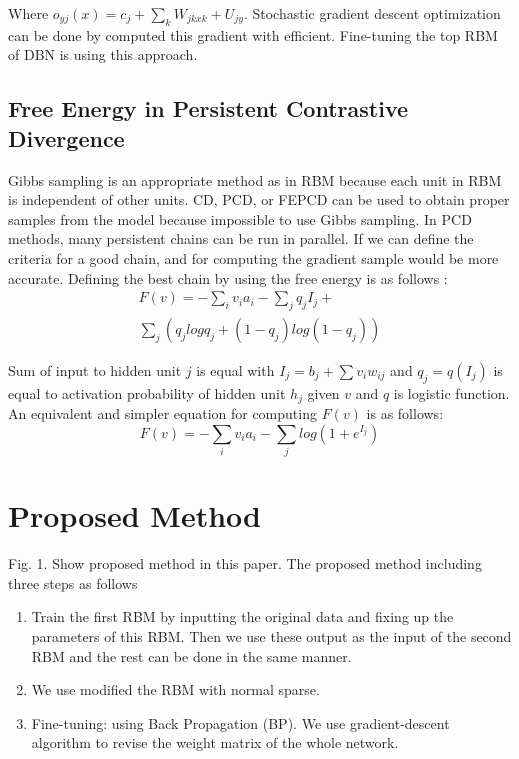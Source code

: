 \documentclass[conference]{IEEEtran}
\begin{document}
Where $o_{yj}\left ( x \right )=c_{j}+\sum_{k}W_{jkxk} + U_{jy}$. Stochastic gradient descent
optimization can be done by computed this gradient with
efficient. Fine-tuning the top RBM of DBN is using this
approach\cite{hinton1}.
\subsection{Free Energy in Persistent Contrastive Divergence}
Gibbs sampling is an appropriate method as in RBM
because each unit in RBM is independent of other units.
CD, PCD, or FEPCD\cite{keyvanrad2} can be used to obtain proper
samples from the model because impossible to use Gibbs
sampling.
In PCD methods, many persistent chains can be run in
parallel. If we can define the criteria for a good chain, and for
computing the gradient sample would be more accurate.
Defining the best chain by using the free energy is as
follows \cite{hinton2} :
\begin{multline}
F\left ( v \right )=-\sum_{i}v_{i}a_{i}-\sum_{j}q_{j}I_{j}+
\\ \sum_{j}\left ( q_{j}log q_{j}+\left ( 1-q_{j} \right )log\left ( 1-q_{j} \right ) \right )
\end{multline}

Sum of input to hidden unit $j$ is equal with $I_{j}=b_{j}+\sum v_{i}w_{ij}$
and $q_{j}=q(I_{j})$ is equal to activation probability of hidden unit
$h_{j}$ given $v$ and $q$ is logistic function. An equivalent and
simpler equation for computing $F(v)$ is as follows:
\begin{equation}
F(v)=-\sum_{i}v_{i}a_{i}-\sum_{j}log(1+e^{I_{j}})
\end{equation}
\section{Proposed Method}
Fig. 1. Show proposed method in this paper. The proposed
method including three steps as follows
\begin{enumerate}
	\item Train the first RBM by inputting the original data and
	fixing up the parameters of this RBM. Then we use
	these output as the input of the second RBM and the
	rest can be done in the same manner.
	\item We use modified the RBM with normal sparse.
	\item Fine-tuning: using Back Propagation (BP). We use
	gradient-descent algorithm to revise the weight
	matrix of the whole network.
	
\end{enumerate}
\end{document}
